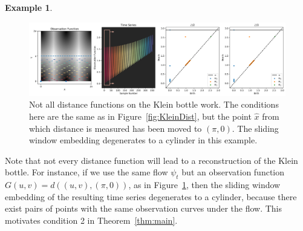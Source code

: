 \documentclass[11pt]{article}
\theoremstyle{definition}
\newtheorem{example}[theorem]{Example}
\theoremstyle{remark}
\begin{document}
\begin{example}
    \begin{figure}[!htb]
        \centering
        \includegraphics[width=\textwidth]{KleinDist_CounterExample.png}
        \caption{Not all distance functions on the Klein bottle work.  The conditions here are the same as in Figure~\ref{fig:KleinDist}, but the point $\hat{x}$ from which distance is measured has been moved to $(\pi, 0)$.  The sliding window embedding degenerates to a cylinder in this example.}
        \label{fig:KleinDistFail}
    \end{figure}

    Note that not every distance function will lead to a reconstruction of the Klein bottle.  For instance, if we use the same flow $\psi_t$ but an observation function $G(u, v) = d((u, v), (\pi, 0))$, as in Figure~\ref{fig:KleinDistFail}, then the sliding window embedding of the resulting time series degenerates to a cylinder, because there exist pairs of points with the same observation curves under the flow.  This motivates condition 2 in Theorem~\ref{thm:main}.
    \end{example}
\end{document}

